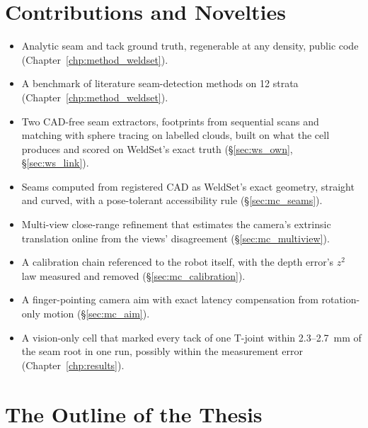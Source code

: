 
\section{Contributions and Novelties}
\label{sec:contributions}

\begin{itemize}
\item Analytic seam and tack ground truth, regenerable at any density, public code
      (Chapter~\ref{chp:method_weldset}).
\item A benchmark of literature seam-detection methods on 12 strata (Chapter~\ref{chp:method_weldset}).
\item Two CAD-free seam extractors, footprints from sequential scans and matching with
      sphere tracing on labelled clouds, built on what the cell produces and scored on
      WeldSet's exact truth (\S\ref{sec:ws_own}, \S\ref{sec:ws_link}).
\item Seams computed from registered CAD as WeldSet's exact geometry, straight and
      curved, with a pose-tolerant accessibility rule (\S\ref{sec:mc_seams}).
\item Multi-view close-range refinement that estimates the camera's extrinsic
      translation online from the views' disagreement (\S\ref{sec:mc_multiview}).
\item A calibration chain referenced to the robot itself, with the depth error's
      $z^2$ law measured and removed (\S\ref{sec:mc_calibration}).
\item A finger-pointing camera aim with exact latency compensation from rotation-only
      motion (\S\ref{sec:mc_aim}).
\item A vision-only cell that marked every tack of one T-joint within 2.3--2.7~mm of the seam
      root in one run, possibly within the measurement error (Chapter~\ref{chp:results}).
\end{itemize}

\section{The Outline of the Thesis}
\label{sec:outline}

